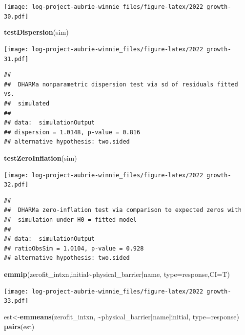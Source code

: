 \documentclass[
]{article}
\newenvironment{Shaded}{\begin{snugshade}}{\end{snugshade}}
\newcommand{\AttributeTok}[1]{\textcolor[rgb]{0.13,0.29,0.53}{#1}}
\newcommand{\FunctionTok}[1]{\textcolor[rgb]{0.13,0.29,0.53}{\textbf{#1}}}
\newcommand{\NormalTok}[1]{#1}
\newcommand{\OtherTok}[1]{\textcolor[rgb]{0.56,0.35,0.01}{#1}}
\newcommand{\SpecialCharTok}[1]{\textcolor[rgb]{0.81,0.36,0.00}{\textbf{#1}}}
\newcommand{\StringTok}[1]{\textcolor[rgb]{0.31,0.60,0.02}{#1}}
\begin{document}
\texttt{[image: log-project-aubrie-winnie\_files/figure-latex/2022 growth-30.pdf]}

\begin{Shaded}
\begin{Highlighting}[]
\FunctionTok{testDispersion}\NormalTok{(sim)}
\end{Highlighting}
\end{Shaded}

\texttt{[image: log-project-aubrie-winnie\_files/figure-latex/2022 growth-31.pdf]}

\begin{verbatim}
## 
##  DHARMa nonparametric dispersion test via sd of residuals fitted vs.
##  simulated
## 
## data:  simulationOutput
## dispersion = 1.0148, p-value = 0.816
## alternative hypothesis: two.sided
\end{verbatim}

\begin{Shaded}
\begin{Highlighting}[]
\FunctionTok{testZeroInflation}\NormalTok{(sim)}
\end{Highlighting}
\end{Shaded}

\texttt{[image: log-project-aubrie-winnie\_files/figure-latex/2022 growth-32.pdf]}

\begin{verbatim}
## 
##  DHARMa zero-inflation test via comparison to expected zeros with
##  simulation under H0 = fitted model
## 
## data:  simulationOutput
## ratioObsSim = 1.0104, p-value = 0.928
## alternative hypothesis: two.sided
\end{verbatim}

\begin{Shaded}
\begin{Highlighting}[]
\FunctionTok{emmip}\NormalTok{(zerofit\_intxn,initial}\SpecialCharTok{\textasciitilde{}}\NormalTok{physical\_barrier}\SpecialCharTok{|}\NormalTok{name, }\AttributeTok{type=}\StringTok{\textquotesingle{}response\textquotesingle{}}\NormalTok{,}\AttributeTok{CI=}\NormalTok{T)}
\end{Highlighting}
\end{Shaded}

\texttt{[image: log-project-aubrie-winnie\_files/figure-latex/2022 growth-33.pdf]}

\begin{Shaded}
\begin{Highlighting}[]
\NormalTok{est}\OtherTok{\textless{}{-}}\FunctionTok{emmeans}\NormalTok{(zerofit\_intxn, }\SpecialCharTok{\textasciitilde{}}\NormalTok{physical\_barrier}\SpecialCharTok{|}\NormalTok{name}\SpecialCharTok{|}\NormalTok{initial, }\AttributeTok{type=}\StringTok{\textquotesingle{}response\textquotesingle{}}\NormalTok{)}
\FunctionTok{pairs}\NormalTok{(est)}
\end{Highlighting}
\end{Shaded}
\end{document}
